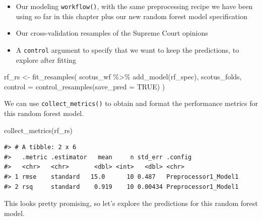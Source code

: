 \documentclass[
]{krantz}
\makeatletter
\newenvironment{Shaded}{\begin{snugshade}}{\end{snugshade}}
\newcommand{\AttributeTok}[1]{\textcolor[rgb]{0.77,0.63,0.00}{#1}}
\newcommand{\ConstantTok}[1]{\textcolor[rgb]{0.00,0.00,0.00}{#1}}
\newcommand{\FunctionTok}[1]{\textcolor[rgb]{0.00,0.00,0.00}{#1}}
\newcommand{\NormalTok}[1]{#1}
\newcommand{\OtherTok}[1]{\textcolor[rgb]{0.56,0.35,0.01}{#1}}
\newcommand{\SpecialCharTok}[1]{\textcolor[rgb]{0.00,0.00,0.00}{#1}}
\newenvironment{kframe}{%
\medskip{}
\setlength{\fboxsep}{.8em}
 \def\at@end@of@kframe{}%
 \ifinner\ifhmode%
  \def\at@end@of@kframe{\end{minipage}}%
  \begin{minipage}{\columnwidth}%
 \fi\fi%
 \def\FrameCommand##1{\hskip\@totalleftmargin \hskip-\fboxsep
 \colorbox{shadecolor}{##1}\hskip-\fboxsep
     \hskip-\linewidth \hskip-\@totalleftmargin \hskip\columnwidth}%
 \MakeFramed {\advance\hsize-\width
   \@totalleftmargin\z@ \linewidth\hsize
   \@setminipage}}%
 {\par\unskip\endMakeFramed%
 \at@end@of@kframe}
\renewenvironment{Shaded}{\begin{kframe}}{\end{kframe}}
\makeatother
\begin{document}
\begin{itemize}
\item
  Our modeling \texttt{workflow()}, with the same preprocessing recipe we have been using so far in this chapter plus our new random forest model specification
\item
  Our cross-validation resamples of the Supreme Court opinions
\item
  A \texttt{control} argument to specify that we want to keep the predictions, to explore after fitting
\end{itemize}

\begin{Shaded}
\begin{Highlighting}[]
\NormalTok{rf\_rs }\OtherTok{\textless{}{-}} \FunctionTok{fit\_resamples}\NormalTok{(}
\NormalTok{  scotus\_wf }\SpecialCharTok{\%\textgreater{}\%} \FunctionTok{add\_model}\NormalTok{(rf\_spec),}
\NormalTok{  scotus\_folds,}
  \AttributeTok{control =} \FunctionTok{control\_resamples}\NormalTok{(}\AttributeTok{save\_pred =} \ConstantTok{TRUE}\NormalTok{)}
\NormalTok{)}
\end{Highlighting}
\end{Shaded}

We can use \texttt{collect\_metrics()} to obtain and format the performance metrics for this random forest model.

\begin{Shaded}
\begin{Highlighting}[]
\FunctionTok{collect\_metrics}\NormalTok{(rf\_rs)}
\end{Highlighting}
\end{Shaded}

\begin{verbatim}
#> # A tibble: 2 x 6
#>   .metric .estimator   mean     n std_err .config             
#>   <chr>   <chr>       <dbl> <int>   <dbl> <chr>               
#> 1 rmse    standard   15.0      10 0.487   Preprocessor1_Model1
#> 2 rsq     standard    0.919    10 0.00434 Preprocessor1_Model1
\end{verbatim}

This looks pretty promising, so let's explore the predictions for this random forest model.
\end{document}
